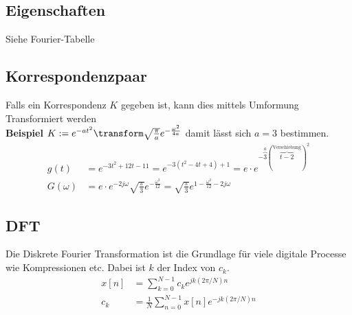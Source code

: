 \subsection{Eigenschaften}
Siehe Fourier-Tabelle

\subsection{Korrespondenzpaar}
Falls ein Korrespondenz $K$ gegeben ist, kann dies mittels Umformung Transformiert werden\\
\noindent\textbf{Beispiel} $K := e^{-at^2} \transform \sqrt{\frac{\pi}{a}}e^{-\frac{\omega^2}{4a}}$ damit lässt sich $a = 3$ bestimmen. 
\begin{align*}
	g(t) &= e^{-3t^2 + 12t - 11} = e^{-3(t^2 -4t + 4) + 1} = e\cdot e^{-\overbrace{3}^{a}(\overbrace{t-2}^{\text{Verschiebung}})^2}\\
	G(\omega) &= e\cdot e^{-2j\omega}\sqrt{\frac{\pi}{3}}e^{-\frac{\omega^2}{12}} = \sqrt{\frac{\pi}{3}}e^{1-\frac{\omega^2}{12}-2j\omega}
\end{align*}

\subsection{DFT}
Die Diskrete Fourier Transformation ist die Grundlage für viele digitale Processe wie Kompressionen etc. Dabei ist $k$ der Index von $c_k$.
\begin{align*}
	x[n] &= \sum_{k=0}^{N-1}c_k e^{jk(2\pi/N)n}  \\
	c_k &= \frac{1}{N}\sum_{n=0}^{N-1}x[n]e^{-jk(2\pi/N)n}
\end{align*}


